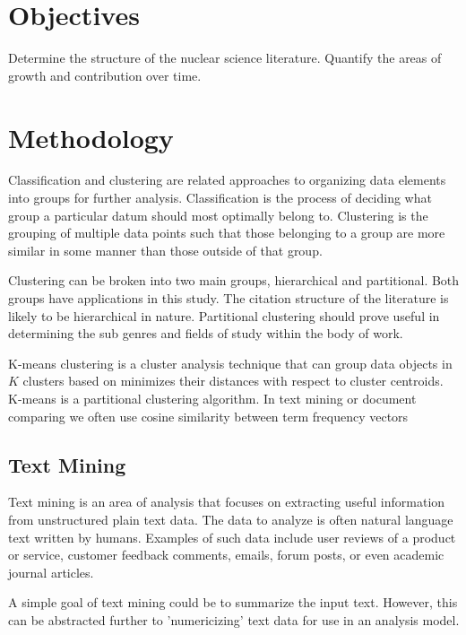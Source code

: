 \documentclass[12pt]{article}
\begin{document}
\begin{doublespacing}
\pagebreak
\section{Objectives}
Determine the structure of the nuclear science literature.
Quantify the areas of growth and contribution over time.

\pagebreak
\section{Methodology}


Classification and clustering are related approaches to organizing data elements into groups for further analysis.
Classification is the process of deciding what group a particular datum should most optimally belong to.
Clustering is the grouping of multiple data points such that those belonging to a group are more similar in some manner than those outside of that group.

Clustering can be broken into two main groups, hierarchical and partitional.
Both groups have applications in this study.
The citation structure of the literature is likely to be hierarchical in nature.
Partitional clustering should prove useful in determining the sub genres and fields of study within the body of work.


K-means clustering is a cluster analysis technique that can group data objects in $K$ clusters based on minimizes their distances with respect to cluster centroids.
K-means is a partitional clustering algorithm.
In text mining or document comparing we often use cosine similarity between term frequency vectors

\subsection{Text Mining}
Text mining is an area of analysis that focuses on extracting useful information from unstructured plain text data.
The data to analyze is often natural language text written by humans.
Examples of such data include user reviews of a product or service, customer feedback comments, emails, forum posts, or even academic journal articles.

A simple goal of text mining could be to summarize the input text.
However, this can be abstracted further to 'numericizing' text data for use in an analysis model.


\end{doublespacing}
\end{document}
